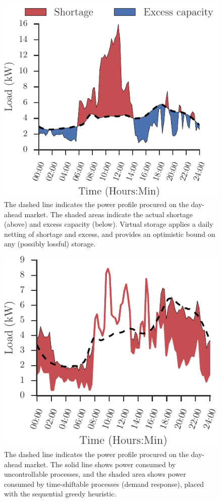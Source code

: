 \documentclass[conference]{IEEEtran}
\begin{document}
\begin{figure}[b]
\centering
\includegraphics[scale=0.9]{figures/slp_shortage.pdf}
\caption{The dashed line indicates the power profile procured on the day-ahead market. The shaded areas indicate the actual shortage (above) and excess capacity (below). Virtual storage applies a daily netting of shortage and excess, and provides an optimistic bound on any (possibly lossful) storage.}
\label{fig:shortage}
\end{figure}

\begin{figure}[b]
\centering
\vspace{6.4mm}\includegraphics[scale=0.9]{figures/movable.pdf}
\caption{The dashed line indicates the power profile procured on the day-ahead market. The solid line shows power consumed by uncontrollable processes, and the shaded area shows power consumed by time-shiftable processes (demand response), placed with the sequential greedy heuristic.}
\label{fig:movable}
\end{figure}
\end{document}
